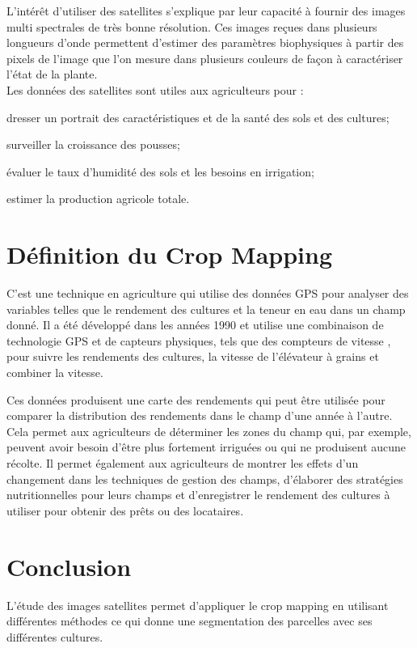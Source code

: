 \documentclass[12pt, openany]{report}
\begin{document}
L'intérêt d'utiliser des satellites s'explique par leur capacité à  fournir des images multi spectrales de très bonne résolution. Ces images reçues dans plusieurs longueurs d'onde permettent d'estimer des paramètres biophysiques à partir des pixels de l'image que l'on mesure dans plusieurs couleurs de façon à caractériser l'état de la plante.\\
Les données des satellites sont utiles aux agriculteurs pour :
\begin{mylist}
\item dresser un portrait des caractéristiques et de la santé des sols et des cultures;
\item surveiller la croissance des pousses;

\item évaluer le taux d'humidité des sols et les besoins en irrigation;
\item estimer la production agricole totale.
\end{mylist}

\section{Définition du Crop Mapping}
C’est une technique en agriculture qui utilise des données GPS pour analyser des variables telles que le rendement des cultures et la teneur en eau dans un champ donné. Il a été développé dans les années 1990 et utilise une combinaison de technologie GPS et de capteurs physiques, tels que des compteurs de vitesse , pour suivre les rendements des cultures, la vitesse de l'élévateur à grains et combiner la vitesse.
\par
Ces données produisent une carte des rendements qui peut être utilisée pour comparer la distribution des rendements dans le champ d'une année à l'autre. Cela permet aux agriculteurs de déterminer les zones du champ qui, par exemple, peuvent avoir besoin d'être plus fortement irriguées ou qui ne produisent aucune récolte. Il permet également aux agriculteurs de montrer les effets d'un changement dans les techniques de gestion des champs, d'élaborer des stratégies nutritionnelles pour leurs champs et d'enregistrer le rendement des cultures à utiliser pour obtenir des prêts ou des locataires.

\section*{Conclusion}
L'étude des images satellites permet d'appliquer le crop mapping en utilisant différentes méthodes ce qui donne une segmentation des parcelles avec ses différentes cultures.
\end{document}
